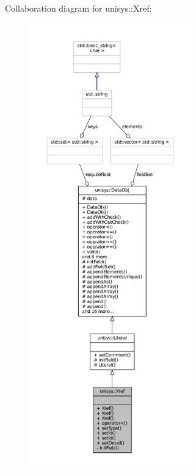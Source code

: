 Collaboration diagram for unisys\-:\-:Xref\-:
\nopagebreak
\begin{figure}[H]
\begin{center}
\leavevmode
\includegraphics[height=550pt]{classunisys_1_1Xref__coll__graph}
\end{center}
\end{figure}
